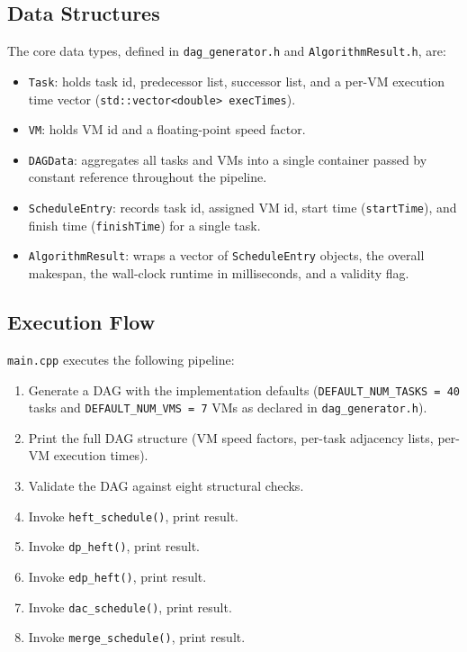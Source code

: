 \documentclass[conference]{IEEEtran}
\begin{document}
\subsection{Data Structures}

The core data types, defined in \texttt{dag\_generator.h} and
\texttt{AlgorithmResult.h}, are:

\begin{itemize}
  \item \texttt{Task}: holds task id, predecessor list, successor
        list, and a per-VM execution time vector
        (\texttt{std::vector<double>\ execTimes}).
  \item \texttt{VM}: holds VM id and a floating-point speed factor.
  \item \texttt{DAGData}: aggregates all tasks and VMs into a single
        container passed by constant reference throughout the pipeline.
  \item \texttt{ScheduleEntry}: records task id, assigned VM id,
        start time (\texttt{startTime}), and finish time
        (\texttt{finishTime}) for a single task.
  \item \texttt{AlgorithmResult}: wraps a vector of
        \texttt{ScheduleEntry} objects, the overall makespan, the
        wall-clock runtime in milliseconds, and a validity flag.
\end{itemize}

\subsection{Execution Flow}

\texttt{main.cpp} executes the following pipeline:
\begin{enumerate}
  \item Generate a DAG with the implementation defaults
        (\texttt{DEFAULT\_NUM\_TASKS = 40} tasks and
        \texttt{DEFAULT\_NUM\_VMS = 7} VMs as declared in
        \texttt{dag\_generator.h}).
  \item Print the full DAG structure (VM speed factors, per-task
        adjacency lists, per-VM execution times).
  \item Validate the DAG against eight structural checks.
      \item Invoke \texttt{heft\_schedule()}, print result.
      \item Invoke \texttt{dp\_heft()}, print result.
      \item Invoke \texttt{edp\_heft()}, print result.
      \item Invoke \texttt{dac\_schedule()}, print result.
      \item Invoke \texttt{merge\_schedule()}, print result.
\end{enumerate}
\end{document}
